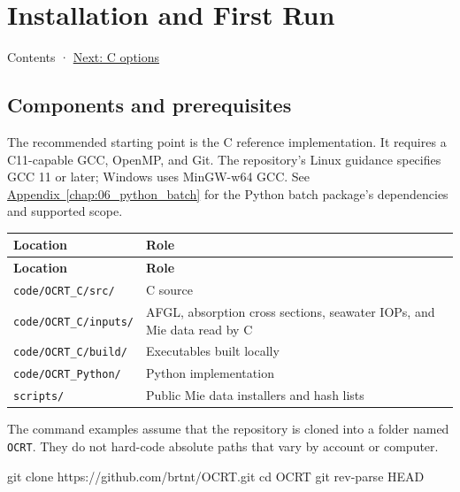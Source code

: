 \chapter{Installation and First Run}
\label{chap:02_installation}
Contents · \hyperref[chap:03_options]{Next: C options}

\section{Components and prerequisites}
\label{sec:auto:02_installation:1}
The recommended starting point is the C reference implementation. It requires a C11-capable GCC, OpenMP, and Git. The repository's Linux guidance specifies GCC 11 or later; Windows uses MinGW-w64 GCC. See \hyperref[chap:06_python_batch]{Appendix~\ref*{chap:06_python_batch}} for the Python batch package's dependencies and supported scope.


{\TableFont
\begin{longtable}{@{}>{\raggedright\arraybackslash}p{}>{\raggedright\arraybackslash}p{}@{}}
\toprule
\textbf{Location} & \textbf{Role} \\
\midrule
\endfirsthead
\toprule
\textbf{Location} & \textbf{Role} \\
\midrule
\endhead
\bottomrule
\endfoot
\texttt{code/\allowbreak{}OCRT\_\allowbreak{}C/\allowbreak{}src/\allowbreak{}} & C source \\
\texttt{code/\allowbreak{}OCRT\_\allowbreak{}C/\allowbreak{}inputs/\allowbreak{}} & AFGL, absorption cross sections, seawater IOPs, and Mie data read by C \\
\texttt{code/\allowbreak{}OCRT\_\allowbreak{}C/\allowbreak{}build/\allowbreak{}} & Executables built locally \\
\texttt{code/\allowbreak{}OCRT\_\allowbreak{}Python/\allowbreak{}} & Python implementation \\
\texttt{scripts/\allowbreak{}} & Public Mie data installers and hash lists \\
\end{longtable}
}

The command examples assume that the repository is cloned into a folder named \texttt{OCRT}. They do not hard-code absolute paths that vary by account or computer.


\par\noindent\begin{minipage}{\linewidth}
\begin{ManualCode}
git clone https://github.com/brtnt/OCRT.git
cd OCRT
git rev-parse HEAD
\end{ManualCode}
\end{minipage}\par

